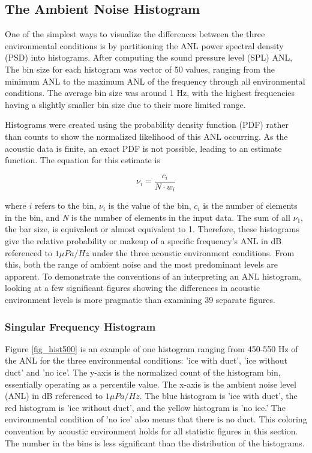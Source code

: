 \subsection{The Ambient Noise Histogram}
One of the simplest ways to visualize the differences between the three environmental conditions is by partitioning the ANL power spectral density (PSD) into histograms. After computing the sound pressure level (SPL) ANL, The bin size for each histogram was vector of 50 values, ranging from the minimum ANL to the maximum ANL of the frequency through all environmental conditions. The average bin size was around 1 Hz, with the highest frequencies having a slightly smaller bin size due to their more limited range. 

Histograms were created using the probability density function (PDF) rather than counts to show the normalized likelihood of this ANL occurring. As the acoustic data is finite, an exact PDF is not possible, leading to an estimate function. The equation for this estimate is

\begin{equation} \label{eq:finitetotvar}
\nu _{i}=\frac{c_{i}}{N \cdot w_{i}} 
\end{equation}

where $i$ refers to the bin, $\nu _{i}$ is the value of the bin, $c_{i}$ is the number of elements in the bin, and \textit{N} is the number of elements in the input data. The sum of all $\nu_{1}$, the bar size, is equivalent or almost equivalent to 1. Therefore, these histograms give the relative probability or makeup of a specific frequency's ANL in dB referenced to  $1 \mu Pa/Hz$ under the three acoustic environment conditions. From this, both the range of ambient noise and the most predominant levels are apparent. To demonstrate the conventions of an interpreting an ANL histogram, looking at a few significant figures showing the differences in acoustic environment levels is more pragmatic than examining 39 separate figures.

\subsubsection{Singular Frequency Histogram}
Figure \ref{fig_hist500} is an example of one histogram ranging from 450-550 Hz of the ANL for the three environmental conditions: 'ice with duct',  'ice without duct' and 'no ice'. The y-axis is the normalized count of the histogram bin, essentially operating as a percentile value. The x-axis is the ambient noise level (ANL) in dB referenced to  $1 \mu Pa/Hz$. The blue histogram is 'ice with duct', the red histogram is 'ice without duct', and the yellow histogram is 'no ice.' The environmental condition of 'no ice' also means that there is no duct. This coloring convention by acoustic environment holds for all statistic figures in this section. The number in the bins is less significant than the distribution of the histograms. 

